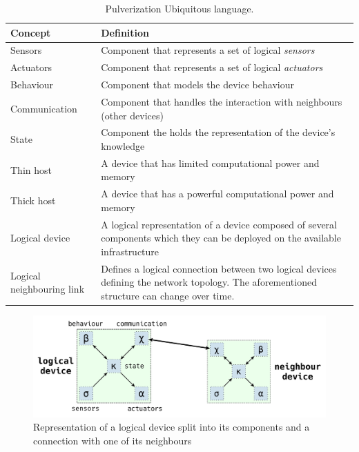 \begin{table}
	\begin{tabularx}{\textwidth}{l X}
		\toprule
		\textbf{Concept}          & \textbf{Definition}                                                                                             \\
		\midrule
		Sensors                   & Component that represents a set of logical \emph{sensors}                                                       \\
		Actuators                 & Component that represents a set of logical \emph{actuators}                                                     \\
		Behaviour                 & Component that models the device behaviour                                                                      \\
		Communication             & Component that handles the interaction with neighbours (other devices)                                          \\
		State                     & Component the holds the representation of the device's knowledge                                                \\
		Thin host                 & A device that has limited computational power and memory                                                        \\
		Thick host                & A device that has a powerful computational power and memory                                                     \\
		Logical device            & A logical representation of a device composed of several components which they can be deployed on the available
		infrastructure                                                                                                                              \\
		Logical neighbouring link & Defines a logical connection between two logical devices defining the network topology.
		The aforementioned structure can change over time.                                                                                          \\
		\bottomrule
	\end{tabularx}
	\label{tab:ubiquitous-language}
	\caption{Pulverization Ubiquitous language.}
\end{table}

\begin{figure}
	\centering
	\includegraphics[width=\textwidth]{figures/original-components-interactions.pdf}
	\caption{Representation of a logical device split into its components and a connection with one of its neighbours}
	\label{fig:logical-device}
\end{figure}

